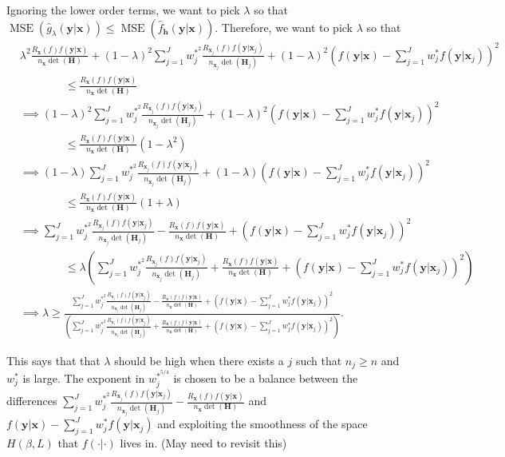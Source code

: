 \documentclass[11pt]{article}
\newcommand{\Hbf}{\textbf{H}}
\newcommand{\y}{\textbf{y}}
\newcommand{\x}{\textbf{x}}
\newcommand{\h}{\textbf{h}}
\newcommand{\wstar}{w^{\textstyle{*}}}
\newcommand{\wstarsq}{w^{\textstyle{*}^2}}
\newcommand{\wstarpwr}{w^{\textstyle{*}^{5/4}}}
\DeclareMathOperator{\MSE}{MSE}
\begin{document}
Ignoring the lower order terms, we want to pick $\lambda$ so that $\MSE(\hat g_\lambda(\y|\x)) \leq \MSE(\hat f_\h(\y|\x))$. Therefore, we want to pick $\lambda$ so that 
\begin{align*}
  &\lambda^2 \frac{R_{\x}(f)f(\y|\x)}{n_\x\det(\Hbf)} 
    + (1 - \lambda)^2\sum_{j=1}^J\wstarsq_j\frac{R_{\x_j}(f)f(\y|\x_j)}{n_{\x_j}\det(\Hbf_j)} 
    + (1-\lambda)^2\left(f(\y|\x) - \sum_{j=1}^J\wstar_jf(\y|\x_j)\right)^2 \\
	&\qquad\qquad\leq \frac{R_{\x}(f)f(\y|\x)}{n_\x\det(\Hbf)} \\
  &\implies (1 - \lambda)^2\sum_{j=1}^J\wstarsq_j\frac{R_{\x_j}(f)f(\y|\x_j)}{n_{\x_j}\det(\Hbf_j)} 
    + (1-\lambda)^2\left(f(\y|\x) - \sum_{j=1}^J\wstar_jf(\y|\x_j)\right)^2 \\
    &\qquad\qquad\leq \frac{R_{\x}(f)f(\y|\x)}{n_\x\det(\Hbf)}(1 - \lambda^2) \\
  &\implies (1 - \lambda)\sum_{j=1}^J\wstarsq_j\frac{R_{\x_j}(f)f(\y|\x_j)}{n_{\x_j}\det(\Hbf_j)} 
    + (1-\lambda)\left(f(\y|\x) - \sum_{j=1}^J\wstar_jf(\y|\x_j)\right)^2 \\
    &\qquad\qquad\leq \frac{R_{\x}(f)f(\y|\x)}{n_\x\det(\Hbf)}(1 + \lambda) \\
  &\implies \sum_{j=1}^J\wstarsq_j\frac{R_{\x_j}(f)f(\y|\x_j)}{n_{\x_j}\det(\Hbf_j)} 
    - \frac{R_{\x}(f)f(\y|\x)}{n_\x\det(\Hbf)}
    + \left(f(\y|\x) - \sum_{j=1}^J\wstar_jf(\y|\x_j)\right)^2 \\
    &\qquad\qquad\leq 
    \lambda\left(\sum_{j=1}^J\wstarsq_j\frac{R_{\x_j}(f)f(\y|\x_j)}{n_{\x_j}\det(\Hbf_j)}
    + \frac{R_{\x}(f)f(\y|\x)}{n_\x\det(\Hbf)} 
    + \left(f(\y|\x) - \sum_{j=1}^J\wstar_jf(\y|\x_j)\right)^2\right) \\
  &\implies \lambda \geq
  \frac
  {
    \sum_{j=1}^J\wstarsq_j\frac{R_{\x_j}(f)f(\y|\x_j)}{n_{\x_j}\det(\Hbf_j)} 
      - \frac{R_{\x}(f)f(\y|\x)}{n_\x\det(\Hbf)}
      + \left(f(\y|\x) - \sum_{j=1}^J\wstar_jf(\y|\x_j)\right)^2
  }
  {
    \left(\sum_{j=1}^J\wstarsq_j\frac{R_{\x_j}(f)f(\y|\x_j)}{n_{\x_j}\det(\Hbf_j)}
      + \frac{R_{\x}(f)f(\y|\x)}{n_\x\det(\Hbf)} 
      + \left(f(\y|\x) - \sum_{j=1}^J\wstar_jf(\y|\x_j)\right)^2\right)
  }.
\end{align*}

This says that that $\lambda$ should be high when there exists a $j$ such that $n_j \geq n$ and $\wstar_j$ is large. The exponent in $\wstarpwr_j$ is chosen to be a balance between the differences 
$
  \sum_{j=1}^J\wstarsq_j\frac{R_{\x_j}(f)f(\y|\x_j)}{n_{\x_j}\det(\Hbf_j)} 
    - \frac{R_{\x}(f)f(\y|\x)}{n_\x\det(\Hbf)}
$
and $f(\y|\x) - \sum_{j=1}^J\wstar_jf(\y|\x_j)$ and exploiting the smoothness of the space $H(\beta, L)$ that $f(\cdot|\cdot)$ lives in. (May need to revisit this)







\end{document}
